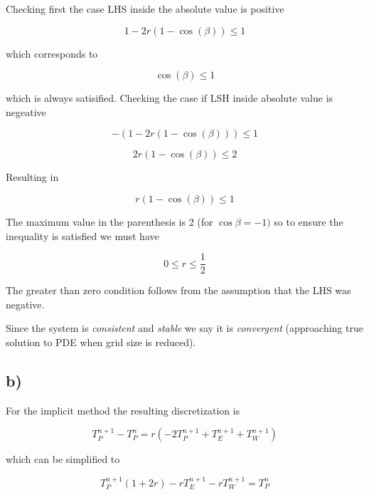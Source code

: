 \documentclass{article}
\begin{document}
Checking first the case LHS inside the absolute value is positive

\begin{equation}
	1 - 2r(1-\cos(\beta)) \leq 1
\end{equation}

which corresponds to 

\begin{equation}
	\cos(\beta) \leq 1
\end{equation}

which is always satisified. Checking the case if LSH inside absolute value is negeative

\begin{equation}
	-(1 - 2r(1-\cos(\beta))) \leq 1
\end{equation}

\begin{equation}
	 2r(1-\cos(\beta)) \leq 2
\end{equation}

Resulting in

\begin{equation}
	r(1-\cos(\beta)) \leq 1
\end{equation}

The maximum value in the parenthesis is 2 (for $\cos\beta = -1)$ so to ensure the inequality is satisfied we must have

\begin{equation}
 	0 \leq r \leq \frac{1}{2}
\end{equation}

The greater than zero condition follows from the assumption that the LHS was negative.

Since the system is \emph{consistent} and \emph{stable} we say it is \emph{convergent} (approaching true solution to PDE when grid size is reduced).

\subsection*{b)}

For the implicit method the resulting discretization is

\begin{equation}
 	T_P^{n+1} -  T_P^n=  r ( -2T_P^{n+1} + T_E^{n+1} + T_W^{n+1})
\end{equation}

which can be simplified to

\begin{equation}
	\label{eq:implicit}
 	T_P^{n+1}(1+2r) -rT_E^{n+1} -r T_W^{n+1} =  T_P^n
\end{equation}
\end{document}
